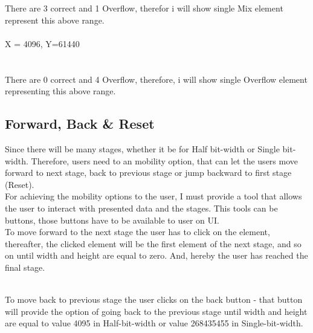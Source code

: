 \documentclass[11pt]{article}
\begin{document}
There are 3 correct and 1 Overflow, therefor i will show single Mix element represent this above range.\\\\
X = 4096, Y=61440\\
\\\\
There are 0 correct and 4 Overflow, therefore, i will show single Overflow element representing this above range. 

\subsection{Forward, Back \& Reset}
Since there will be many stages, whether it be for Half bit-width or Single bit-width. Therefore, users need  to an mobility option, that can let the users move forward to next stage, back to previous stage or jump backward to first stage (Reset). \\

For achieving the mobility options to the user, I must provide a tool that allows the user to interact with presented data and the stages. This tools can be buttons, those buttons have to be available to user on UI.\\

To move forward to the next stage the user has to click on the element, thereafter, the clicked element will be the first element of the next stage, and so on until width and height are equal to zero. And, hereby the user has reached the final stage.\\\

To move back to previous stage the user clicks on the back button - that button will provide the option of going back to the previous stage until width and height are equal to value 4095 in Half-bit-width or value 268435455 in Single-bit-width.\\
\end{document}
